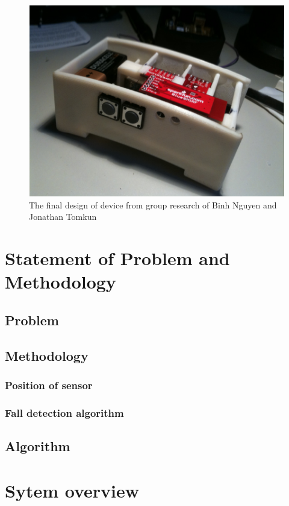 \documentclass[letterpaper,12pt,titlepage,oneside,final]{book}
\begin{document}
 \begin{figure}[h!]
	\centering
	\includegraphics[scale=0.7]{binhnguyen_device}
	\caption{The final design of device from group research of Binh Nguyen and Jonathan Tomkun}
\end{figure}  

\chapter{Statement of Problem and Methodology}

\section{Problem}

\section{Methodology}

\subsection{Position of sensor}

\subsection{Fall detection algorithm}

\section{Algorithm}

\chapter{Sytem overview}
\end{document}
